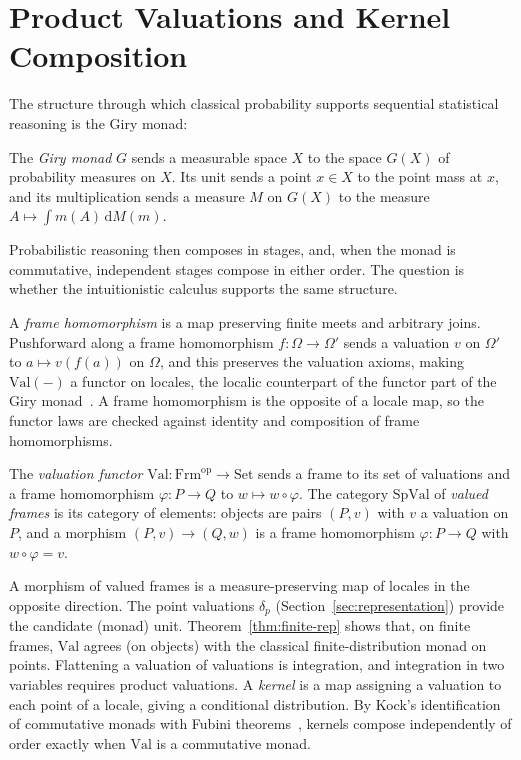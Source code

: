 \section{Product Valuations and Kernel Composition}
\label{sec:monad}

The structure
through which classical probability supports sequential statistical
reasoning is the Giry monad:

\begin{definition}
\label{def:giry}
The \emph{Giry monad} $G$ sends a measurable space $X$ to the space
$G(X)$ of probability measures on $X$.  Its unit sends a point
$x \in X$ to the point mass at $x$, and its multiplication sends a
measure $M$ on $G(X)$ to the measure
$A \mapsto \int m(A) \,\mathrm{d}M(m)$.
\end{definition}

\noindent
Probabilistic reasoning then composes in stages, and, when the monad
is commutative, independent stages compose in either order.  The
question is whether the intuitionistic calculus supports the same
structure.

A \emph{frame
homomorphism} is a map preserving finite meets and arbitrary joins.
Pushforward along
a frame homomorphism $f : \Omega \to \Omega'$ sends a valuation $v$
on $\Omega'$ to $a \mapsto v(f(a))$ on $\Omega$, and this preserves
the valuation axioms, making $\mathrm{Val}(-)$ a functor on
locales, the localic counterpart of the functor part of the Giry
monad~\cite{giry1982}.  A frame homomorphism is the opposite of a 
locale map, so the functor laws are checked against
identity and composition of frame
homomorphisms.

\begin{definition}
\label{def:spval}
The \emph{valuation functor} $\mathrm{Val} : \mathrm{Frm}^{\mathrm{op}} \to
\mathrm{Set}$ sends a frame to its set of valuations and a frame
homomorphism $\varphi : P \to Q$ to $w \mapsto w \circ \varphi$. The
category $\mathrm{SpVal}$ of \emph{valued frames} is its category of
elements: objects are pairs $(P, v)$ with $v$ a valuation on $P$, and a
morphism $(P, v) \to (Q, w)$ is a frame homomorphism $\varphi : P \to Q$
with $w \circ \varphi = v$.
\end{definition}

\noindent
A morphism of valued frames is a measure-preserving map of locales in
the opposite direction.  The point valuations
$\delta_p$ (Section~\ref{sec:representation}) provide the candidate
(monad) unit.
Theorem~\ref{thm:finite-rep} shows that, on finite frames,
$\mathrm{Val}$ agrees (on objects) with the classical
finite-distribution monad on points.  
Flattening a valuation of valuations is
integration, and integration in two variables requires product
valuations.  A \emph{kernel} is a map assigning a valuation to each point
of a locale, giving a conditional distribution.  By Kock's
identification of commutative monads with Fubini
theorems~\cite{kock2012}, kernels compose independently of order
exactly when $\mathrm{Val}$ is a commutative monad.  

